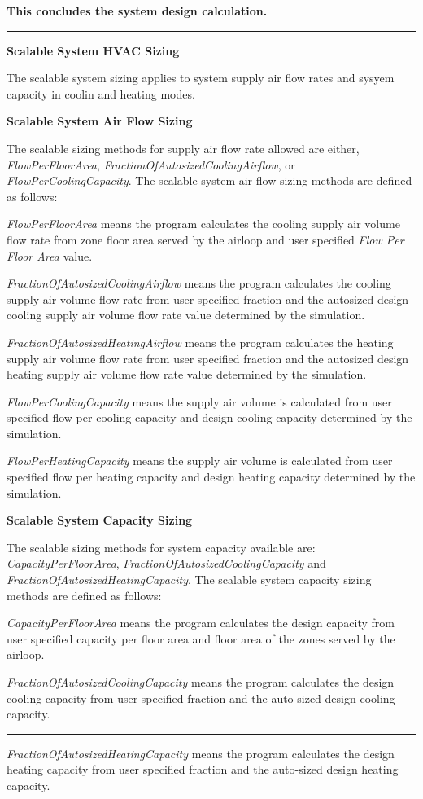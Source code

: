 \textbf{This concludes the system design calculation.}

\begin{center}\rule{0.5\linewidth}{\linethickness}\end{center}

\textbf{Scalable System HVAC Sizing}

The scalable system sizing applies to system supply air flow rates and sysyem capacity in coolin and heating modes.

\textbf{Scalable System Air Flow Sizing}

The scalable sizing methods for supply air flow rate allowed are either, \emph{FlowPerFloorArea}, \emph{FractionOfAutosizedCoolingAirflow}, or \emph{FlowPerCoolingCapacity}. The scalable system air flow sizing methods are defined as follows:

\emph{FlowPerFloorArea} means the program calculates the cooling supply air volume flow rate from zone floor area served by the airloop and user specified \emph{Flow Per Floor Area} value.

\emph{FractionOfAutosizedCoolingAirflow} means the program calculates the cooling supply air volume flow rate from user specified fraction and the autosized design cooling supply air volume flow rate value determined by the simulation.

\emph{FractionOfAutosizedHeatingAirflow} means the program calculates the heating supply air volume flow rate from user specified fraction and the autosized design heating supply air volume flow rate value determined by the simulation.

\emph{FlowPerCoolingCapacity} means the supply air volume is calculated from user specified flow per cooling capacity and design cooling capacity determined by the simulation.

\emph{FlowPerHeatingCapacity} means the supply air volume is calculated from user specified flow per heating capacity and design heating capacity determined by the simulation.

\textbf{Scalable System Capacity Sizing}

The scalable sizing methods for system capacity available are: \emph{CapacityPerFloorArea}, \emph{FractionOfAutosizedCoolingCapacity} and \emph{FractionOfAutosizedHeatingCapacity}. The scalable system capacity sizing methods are defined as follows:

\emph{CapacityPerFloorArea} means the program calculates the design capacity from user specified capacity per floor area and floor area of the zones served by the airloop.

\emph{FractionOfAutosizedCoolingCapacity} means the program calculates the design cooling capacity from user specified fraction and the auto-sized design cooling capacity.

\begin{center}\rule{0.5\linewidth}{\linethickness}\end{center}

\emph{FractionOfAutosizedHeatingCapacity} means the program calculates the design heating capacity from user specified fraction and the auto-sized design heating capacity.
